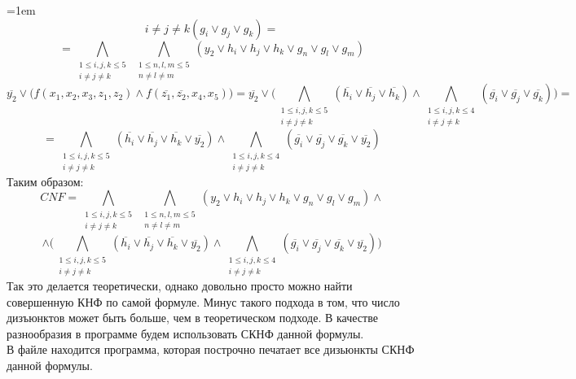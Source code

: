\documentclass[12pt]{extreport}
\theoremstyle{definiton}
\theoremstyle{definition}
\theoremstyle{definition}
\let\leq\leqslant
\newenvironment{blockquote}{%
  \par%
  \medskip
  \leftskip=1em%
  \noindent}{%
  \par\medskip}
\begin{document}
\begin{blockquote}
{$${{{	i \neq j \neq k}} (g_i \vee g_j \vee g_k)} = $$
	$$= {\bigwedge\limits_{\substack{1 \leq i, j, k \leq 5 \\
	i \neq j \neq k}}} \ {\bigwedge\limits_{\substack{1 \leq n, l, m \leq 5 \\ n \neq l \neq m}}} (y_2 \vee h_i \vee h_j \vee h_k \vee g_n \vee g_l \vee g_m)$$
	$$\overline{y_2} \vee \big(f(x_1, x_2, x_3, z_1, z_2) \wedge f(\overline{z_1}, \overline{z_2}, x_4, x_5)\big) = \overline{y_2} \vee \big({\bigwedge\limits_{\substack{1 \leq i, j, k \leq 5 \\
	i \neq j \neq k}} (\overline{h_{i}} \vee \overline{h_{j}} \vee \overline{h_{k}})} \wedge {\bigwedge\limits_{\substack{1 \leq i, j, k \leq 4 \\
	i \neq j \neq k}} (\overline{g_{i}} \vee \overline{g_{j}} \vee \overline{g_{k}})}\big) =$$
	$$= {\bigwedge\limits_{\substack{1 \leq i, j, k \leq 5 \\
	i \neq j \neq k}} (\overline{h_{i}} \vee \overline{h_{j}} \vee \overline{h_{k}} \vee \overline{y_2})} \wedge {\bigwedge\limits_{\substack{1 \leq i, j, k \leq 4 \\
	i \neq j \neq k}} (\overline{g_{i}} \vee \overline{g_{j}} \vee \overline{g_{k}}  \vee \overline{y_2})}$$
	Таким образом:\\
	$$CNF = {\bigwedge\limits_{\substack{1 \leq i, j, k \leq 5 \\
	i \neq j \neq k}}} \ {\bigwedge\limits_{\substack{1 \leq n, l, m \leq 5 \\ n \neq l \neq m}}} (y_2 \vee h_i \vee h_j \vee h_k \vee g_n \vee g_l \vee g_m) \wedge$$
	$$\wedge \big({\bigwedge\limits_{\substack{1 \leq i, j, k \leq 5 \\
	i \neq j \neq k}} (\overline{h_{i}} \vee \overline{h_{j}} \vee \overline{h_{k}} \vee \overline{y_2})} \wedge {\bigwedge\limits_{\substack{1 \leq i, j, k \leq 4 \\
	i \neq j \neq k}} (\overline{g_{i}} \vee \overline{g_{j}} \vee \overline{g_{k}}  \vee \overline{y_2})}\big)$$
	Так это делается теоретически, однако довольно просто можно найти совершенную КНФ по самой формуле. Минус такого подхода в том, что число дизъюнктов может быть больше, чем в теоретическом подходе. В качестве разнообразия в программе будем использовать СКНФ данной формулы.\\
	В файле {} находится программа, которая построчно печатает все дизьюнкты СКНФ данной формулы.\\
    }
    \end{blockquote}
\end{document}
